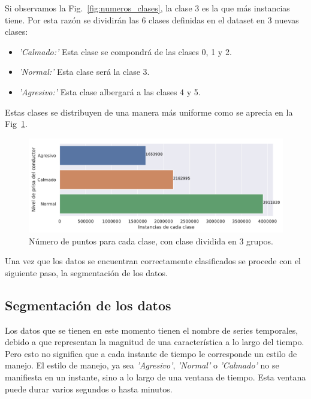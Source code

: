 Si observamos la Fig.~\ref{fig:numeros_clases}, la clase 3 es la que más instancias tiene. Por esta razón se dividirán las 6 clases definidas en el dataset en 3 nuevas clases:

\begin{itemize}
    \itemsep0em
    \item \textit{'Calmado:'} Esta clase se compondrá de las clases 0, 1 y 2.
    \item \textit{'Normal:'} Esta clase será la clase 3.
    \item \textit{'Agresivo:'} Esta clase albergará a las clases 4 y 5.
\end{itemize}

Estas clases se distribuyen de una manera más uniforme como se aprecia en la Fig~\ref{fig:numeros_clases_3}.

\begin{figure}[hbt!]
\centering
\includegraphics[width=\textwidth]{instancia_clases_3.pdf}
\caption{Número de puntos para cada clase, con clase dividida en 3 grupos.}
\label{fig:numeros_clases_3}
\end{figure}

Una vez que los datos se encuentran correctamente clasificados se procede con el siguiente paso, la segmentación de los datos.

\subsection{Segmentación de los datos}

Los datos que se tienen en este momento tienen el nombre de series temporales, debido a que representan la magnitud de una característica a lo largo del tiempo. Pero esto no significa que a cada instante de tiempo le corresponde un estilo de manejo. El estilo de manejo, ya sea \textit{'Agresivo'}, \textit{'Normal'} o \textit{'Calmado'} no se manifiesta en un instante, sino a lo largo de una ventana de tiempo. Esta ventana puede durar varios segundos o hasta minutos.

